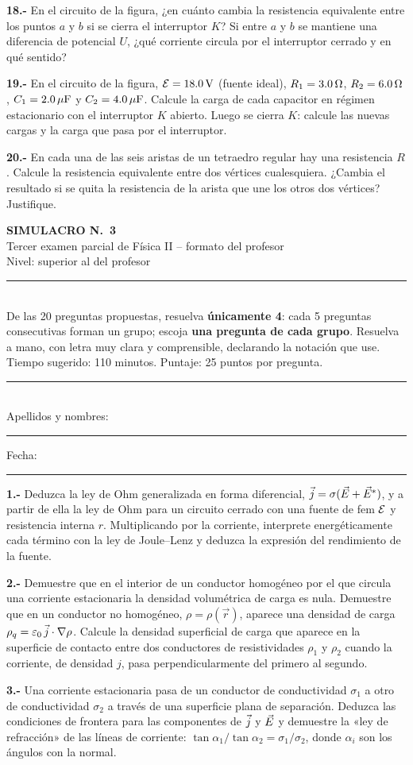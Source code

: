 \documentclass[11pt]{article}
\newcommand{\cabecera}[3]{%
\begin{center}
{\Large\bfseries SIMULACRO N.\textordmasculine\ #1}\\[2pt]
{\large Tercer examen parcial de Física II -- formato del profesor}\\[2pt]
{\normalsize Nivel: #2}
\end{center}
\noindent\rule{\linewidth}{0.6pt}\\
{\small De las 20 preguntas propuestas, resuelva \textbf{únicamente 4}: cada 5 preguntas consecutivas forman un grupo; escoja \textbf{una pregunta de cada grupo}. Resuelva a mano, con letra muy clara y comprensible, declarando la notación que use. Tiempo sugerido: #3. Puntaje: 25 puntos por pregunta.}\\
\noindent\rule{\linewidth}{0.6pt}\\[2pt]
Apellidos y nombres: \rule{6.5cm}{0.4pt}\hfill Fecha: \rule{3cm}{0.4pt}\par\medskip}
\newcommand{\grupo}[1]{\par\medskip{\color{azul}\bfseries Grupo #1}\par\smallskip}
\newcommand{\p}[1]{\par\smallskip\textbf{#1.-} }
\begin{document}
\p{18} En el circuito de la figura, ¿en cuánto cambia la resistencia equivalente entre los puntos $a$ y $b$ si se cierra el interruptor $K$? Si entre $a$ y $b$ se mantiene una diferencia de potencial $U$, ¿qué corriente circula por el interruptor cerrado y en qué sentido?
\begin{center}\circInterruptor\end{center}

\p{19} En el circuito de la figura, $\fem=18.0\uu{V}$ (fuente ideal), $R_1=3.0\ohm$, $R_2=6.0\ohm$, $C_1=2.0\uu{\mu F}$ y $C_2=4.0\uu{\mu F}$. Calcule la carga de cada capacitor en régimen estacionario con el interruptor $K$ abierto. Luego se cierra $K$: calcule las nuevas cargas y la carga que pasa por el interruptor.
\begin{center}\circSdosQdiecinueve\end{center}

\p{20} En cada una de las seis aristas de un tetraedro regular hay una resistencia $R$. Calcule la resistencia equivalente entre dos vértices cualesquiera. ¿Cambia el resultado si se quita la resistencia de la arista que une los otros dos vértices? Justifique.
\begin{center}\circTetraedro\end{center}

\newpage
\cabecera{3}{superior al del profesor}{110 minutos}

\grupo{I}
\p{1} Deduzca la ley de Ohm generalizada en forma diferencial, $\vj=\sigma(\vE+\vE^*)$, y a partir de ella la ley de Ohm para un circuito cerrado con una fuente de fem $\fem$ y resistencia interna $r$. Multiplicando por la corriente, interprete energéticamente cada término con la ley de Joule--Lenz y deduzca la expresión del rendimiento de la fuente.

\p{2} Demuestre que en el interior de un conductor homogéneo por el que circula una corriente estacionaria la densidad volumétrica de carga es nula. Demuestre que en un conductor no homogéneo, $\rho=\rho(\vec r)$, aparece una densidad de carga $\rho_q=\varepsilon_0\,\vj\cdot\nabla\rho$. Calcule la densidad superficial de carga que aparece en la superficie de contacto entre dos conductores de resistividades $\rho_1$ y $\rho_2$ cuando la corriente, de densidad $j$, pasa perpendicularmente del primero al segundo.

\p{3} Una corriente estacionaria pasa de un conductor de conductividad $\sigma_1$ a otro de conductividad $\sigma_2$ a través de una superficie plana de separación. Deduzca las condiciones de frontera para las componentes de $\vj$ y $\vE$ y demuestre la «ley de refracción» de las líneas de corriente: $\tan\alpha_1/\tan\alpha_2=\sigma_1/\sigma_2$, donde $\alpha_i$ son los ángulos con la normal.
\end{document}
